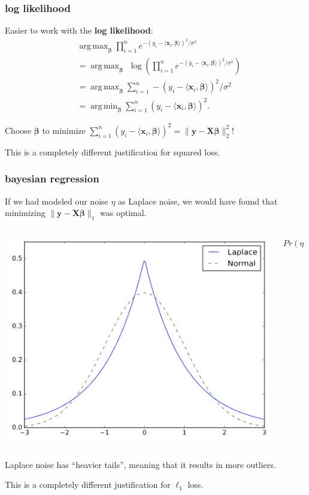 \documentclass[handout,compress]{beamer}
\newcommand{\bs}[1]{\boldsymbol{#1}}
\newcommand{\bv}[1]{\mathbf{#1}}
\DeclareMathOperator*{\argmin}{arg\,min}
\DeclareMathOperator*{\argmax}{arg\,max}
\begin{document}
\begin{frame}
	\frametitle{log likelihood}
	Easier to work with the \alert{\textbf{log likelihood}}:
	\begin{align*}
	&\argmax_{\bs{\beta}} \prod_{i=1}^n e^{-(y_i - \langle \bv{x}_i, \bs{\beta} \rangle)^2/\sigma^2} \\ 
	&= \argmax_{\bs{\beta}}\,\, \log\left(\prod_{i=1}^n e^{-(y_i - \langle \bv{x}_i, \bs{\beta} \rangle)^2/\sigma^2} \right)\\
	&= \argmax_{\bs{\beta}}  \sum_{i=1}^n -(y_i - \langle \bv{x}_i, \bs{\beta} \rangle)^2/\sigma^2\\
	&= \argmin_{\bs{\beta}}  \sum_{i=1}^n (y_i - \langle \bv{x}_i, \bs{\beta} \rangle)^2.
	\end{align*}
	
	Choose $\bs{\beta}$ to minimize $\sum_{i=1}^n (y_i - \langle \bv{x}_i, \bs{\beta} \rangle)^2 = \|\bv{y} - \bv{X}\bs{\beta}\|_2^2$!
	
	
	This is a completely different justification for squared loss. 
\end{frame}

\begin{frame}
	\frametitle{bayesian regression}
		If we had modeled our noise $\eta$ as Laplace noise, we would have found that minimizing $\|\bv{y} - \bv{X}\bs{\beta}\|_1$ was optimal.
		
		\vspace{1em}
		\begin{columns}
			\begin{column}{.5\textwidth}
				\hspace{2em}\includegraphics[width=.9\textwidth]{laplacen.png}
			\end{column}
			\begin{column}{.5\textwidth}
				$Pr(\eta = z) \sim$
			\end{column}
		\end{columns}
	
	Laplace noise has ``heavier tails'', meaning that it results in more outliers.
	
		This is a completely different justification for $\ell_1$ loss. 
\end{frame}
\end{document}
